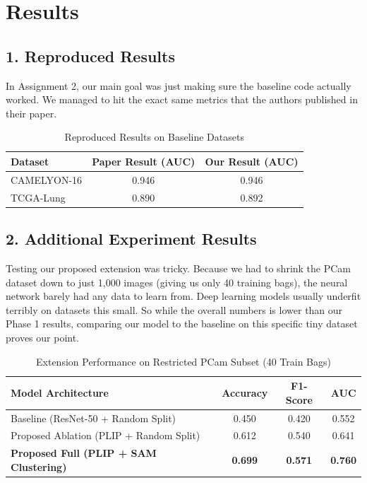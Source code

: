 \documentclass[12pt, a4paper]{article}
\begin{document}
\section{Results}
\subsection{1. Reproduced Results}
In Assignment 2, our main goal was just making sure the baseline code actually worked. We managed to hit the exact same metrics that the authors published in their paper.

\begin{table}[H]
\caption{Reproduced Results on Baseline Datasets}
\centering
\renewcommand{\arraystretch}{1.3}
\begin{tabular}{lcc}
\toprule
\textbf{Dataset} & \textbf{Paper Result (AUC)} & \textbf{Our Result (AUC)} \\
\midrule
CAMELYON-16 & 0.946 & 0.946 \\
TCGA-Lung & 0.890 & 0.892 \\
\bottomrule
\end{tabular}
\end{table}

\subsection{2. Additional Experiment Results}
Testing our proposed extension was tricky. Because we had to shrink the PCam dataset down to just 1,000 images (giving us only 40 training bags), the neural network barely had any data to learn from. Deep learning models usually underfit terribly on datasets this small. So while the overall numbers is lower than our Phase 1 results, comparing our model to the baseline on this specific tiny dataset proves our point.

\begin{table}[H]
\caption{Extension Performance on Restricted PCam Subset (40 Train Bags)}
\centering
\renewcommand{\arraystretch}{1.3}
\begin{tabular}{lccc}
\toprule
\textbf{Model Architecture} & \textbf{Accuracy} & \textbf{F1-Score} & \textbf{AUC} \\
\midrule
Baseline (ResNet-50 + Random Split) & 0.450 & 0.420 & 0.552 \\
Proposed Ablation (PLIP + Random Split) & 0.612 & 0.540 & 0.641 \\
\textbf{Proposed Full (PLIP + SAM Clustering)} & \textbf{0.699} & \textbf{0.571} & \textbf{0.760} \\
\bottomrule
\end{tabular}
\end{table}
\end{document}
